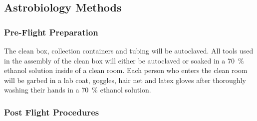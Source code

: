 \subsection{Astrobiology Methods}
\label{sec:Astrobiology Methods}

\subsubsection{Pre-Flight Preparation}


The clean box, collection containers and tubing will be autoclaved. All tools used in the assembly of the clean box will either be autoclaved or soaked in a \SI{70}{\percent} ethanol solution inside of a clean room. Each person who enters the clean room will be garbed in a lab coat, goggles, hair net and latex gloves after thoroughly washing their hands in a \SI{70}{\percent} ethanol solution. 





\subsubsection{Post Flight Procedures}


